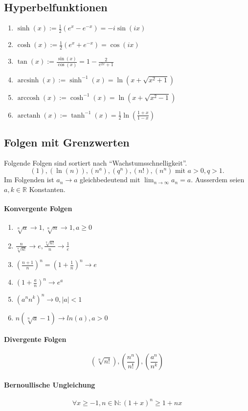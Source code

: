 \documentclass[a4paper, 9pt, DIV=24]{scrartcl}
\DeclareMathOperator{\arcsinh}{arcsinh}
\DeclareMathOperator{\arccosh}{arccosh}
\DeclareMathOperator{\arctanh}{arctanh}
\newcommand{\N}{\mathbb{N}}
\begin{document}
\subsection{Hyperbelfunktionen}
\begin{enumerate}[label={(}\arabic*{)}]
 \item $\sinh(x) := \frac{1}{2}(e^x-e^{-x}) = -i\sin(ix)$
 \item $\cosh(x) := \frac{1}{2}(e^x+e^{-x}) = \cos(ix)$
 \item $\tan(x) := \frac{\sin(x)}{\cos(x)} = 1 - \frac{2}{e^{2x}+1}$
 \item $\arcsinh(x) := \sinh^{-1}(x) = \ln(x + \sqrt{x^2+1})$
 \item $\arccosh(x) := \cosh^{-1}(x) = \ln(x + \sqrt{x^2-1})$
 \item $\arctanh(x) := \tanh^{-1}(x) = \frac{1}{2}\ln(\frac{1+x}{1-x})$
\end{enumerate}

\subsection{Folgen mit Grenzwerten}
Folgende Folgen sind sortiert nach ``Wachstumsschnelligkeit''.
\[ (1), (\ln(n)), (n^{a}), (q^n), (n!), (n^n) \text{ mit } a > 0, q > 1.\]
Im Folgenden ist $a_n \to a$ gleichbedeutend mit $\lim_{n\to\infty} a_n = a$.
Ausserdem seien $a,k\in\mathbb{R}$ Konstanten.
\paragraph{Konvergente Folgen}
\begin{enumerate}[label={(}\arabic*{)}]
 \item $\sqrt[n]{a} \to 1, \sqrt[n]{n} \to 1, a \geq 0$
 \item $\frac{n}{\sqrt[n]{n!}} \to e, \frac{\sqrt[n]{n!}}{n} \to \frac{1}{e}$
 \item $(\frac{n+1}{n})^n = (1 + \frac{1}{n})^n \to e$
 \item $(1 + \frac{a}{n})^n \to e^a$
 \item $(a^nn^k)^n \to 0, |a| < 1$
 \item $n(\sqrt[n]{a}-1) \to ln(a), a > 0$
\end{enumerate}
\paragraph{Divergente Folgen}
\[ (\sqrt[n]{n!}), (\frac{n^n}{n!}), (\frac{a^n}{n^k}) \]
\paragraph{Bernoullische Ungleichung}
\[ \forall x\geq -1, n\in\N: (1+x)^n \geq 1 + nx \]
\end{document}
